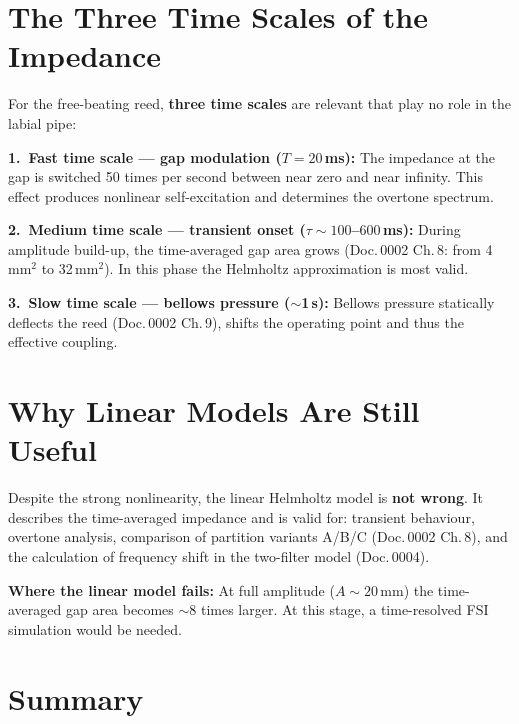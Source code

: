 \documentclass[11pt,a4paper]{article}
\begin{document}
\section{The Three Time Scales of the Impedance}

For the free-beating reed, \textbf{three time scales} are relevant that play no role in the labial pipe:

\textbf{1.\ Fast time scale --- gap modulation ($T = 20$\,ms):} The impedance at the gap is switched 50 times per second between near zero and near infinity. This effect produces nonlinear self-excitation and determines the overtone spectrum.

\textbf{2.\ Medium time scale --- transient onset ($\tau \sim 100$--$600$\,ms):} During amplitude build-up, the time-averaged gap area grows (Doc.\,0002 Ch.\,8: from 4\,mm$^2$ to 32\,mm$^2$). In this phase the Helmholtz approximation is most valid.

\textbf{3.\ Slow time scale --- bellows pressure ($\sim$1\,s):} Bellows pressure statically deflects the reed (Doc.\,0002 Ch.\,9), shifts the operating point and thus the effective coupling.

\section{Why Linear Models Are Still Useful}

Despite the strong nonlinearity, the linear Helmholtz model is \textbf{not wrong}. It describes the time-averaged impedance and is valid for: transient behaviour, overtone analysis, comparison of partition variants A/B/C (Doc.\,0002 Ch.\,8), and the calculation of frequency shift in the two-filter model (Doc.\,0004).

\begin{warnbox}
\textbf{Where the linear model fails:} At full amplitude ($A \sim 20$\,mm) the time-averaged gap area becomes $\sim$8 times larger. At this stage, a time-resolved FSI simulation would be needed.
\end{warnbox}

\section{Summary}
\end{document}
